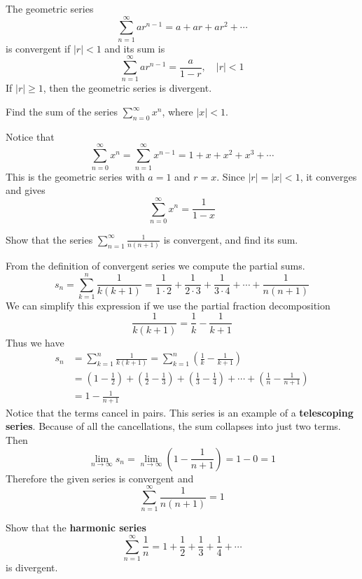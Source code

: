The geometric series
\[\sum_{n=1}^\infty ar^{n-1}=a+ar+ar^2+\cdots\]
is convergent if \(|r|<1\) and
its sum is
\[\sum_{n=1}^\infty ar^{n-1}=\frac{a}{1-r},\quad|r|<1\]
If \(|r|\geq 1\), then the geometric series is divergent.
\begin{problem}
    Find the sum of the series \(\displaystyle{\sum_{n=0}^\infty x^n}\), where
    \(|x|<1\).
\end{problem}
\begin{solution}
    Notice that
    \[\sum_{n=0}^\infty x^n=\sum_{n=1}^{\infty}x^{n-1}=1+x+x^2+x^3+\cdots\]
    This is the geometric series with \(a=1\) and \(r=x\).
    Since \(|r|=|x|<1\), it converges and gives
    \[\sum_{n=0}^\infty x^n=\frac{1}{1-x}\]
\end{solution}
\begin{problem}
    Show that the series \(\displaystyle{\sum_{n=1}^\infty\frac{1}{n(n+1)}}\)
    is convergent, and find its sum.
\end{problem}
\begin{solution}
    From the definition of convergent series we compute the partial sums.
    \[s_n=\sum_{k=1}^n\frac{1}{k(k+1)}
    =\frac{1}{1\cdot 2}+\frac{1}{2\cdot 3}+\frac{1}{3\cdot 4}+\cdots
    +\frac{1}{n(n+1)}\]
    We can simplify this expression if we use the partial fraction
    decomposition
    \[\frac{1}{k(k+1)}=\frac{1}{k}-\frac{1}{k+1}\]
    Thus we have
    \begin{align*}
        s_n &= \sum_{k=1}^n\frac{1}{k(k+1)}
        =\sum_{k=1}^n\left(\frac{1}{k}-\frac{1}{k+1}\right) \\
        &= \left(1-\frac{1}{2}\right)+\left(\frac{1}{2}-\frac{1}{3}\right)
        +\left(\frac{1}{3}-\frac{1}{4}\right)+\cdots
        +\left(\frac{1}{n}-\frac{1}{n+1}\right) \\
        &= 1-\frac{1}{n+1}
    \end{align*}
    Notice that the terms cancel in pairs.
    This series is an example of a \textbf{telescoping series}.
    Because of all the cancellations, the sum collapses into just two terms.
    Then
    \[\lim_{n\to\infty}s_n=\lim_{n\to\infty}\left(1-\frac{1}{n+1}\right)=1-0
    =1\]
    Therefore the given series is convergent and
    \[\sum_{n=1}^\infty\frac{1}{n(n+1)}=1\]
\end{solution}
\begin{problem}
    Show that the \textbf{harmonic series}
    \[\sum_{n=1}^\infty \frac{1}{n}=1+\frac{1}{2}+\frac{1}{3}+\frac{1}{4}
    +\cdots\]
    is divergent.
\end{problem}
